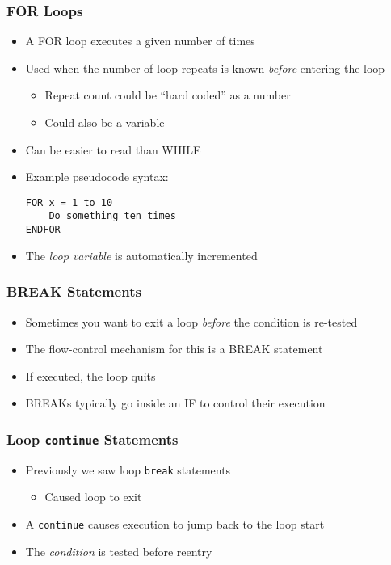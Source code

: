 \documentclass[14pt]{beamer}
\begin{document}
\begin{frame}[fragile]
\frametitle{FOR Loops}
\begin{itemize}
\item A FOR loop executes a given number of times
\item Used when the number of loop repeats is known \textit{before} entering the loop
	\begin{itemize}
		\item Repeat count could be ``hard coded'' as a number
		\item Could also be a variable
	\end{itemize}
\item Can be easier to read than WHILE
\item Example pseudocode syntax:
\begin{lstlisting}[style=pseudo]
FOR x = 1 to 10
	Do something ten times
ENDFOR
\end{lstlisting}
\item The \textit{loop variable} is automatically incremented
\end{itemize}
\end{frame}

\begin{frame}
\frametitle{BREAK Statements}
\begin{itemize}
\item Sometimes you want to exit a loop \textit{before} the condition is re-tested
\item The flow-control mechanism for this is a BREAK statement
\item If executed, the loop quits
\item BREAKs typically go inside an IF to control their execution
\end{itemize}
\end{frame}

\begin{frame}
\frametitle{Loop \texttt{continue} Statements}
\begin{itemize}
	\item Previously we saw loop \texttt{break} statements
		\begin{itemize}
			\item Caused loop to exit
		\end{itemize}
	\item A \texttt{continue} causes execution to jump back to the loop start
	\item The \textit{condition} is tested before reentry
	
\end{itemize}
\end{frame}
\end{document}
